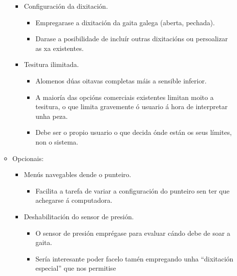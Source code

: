 \begin{itemize}
\begin{itemize}
\begin{itemize}
                 \item Configuración da dixitación.
                       \begin{itemize}
                        \item Empregarase a dixitación da gaita galega (aberta,
                              pechada).
                        \item Darase a posibilidade de incluír outras
                              dixitacións ou persoalizar as xa existentes.
                       \end{itemize}
                 \item Tesitura ilimitada.
                       \begin{itemize}
                        \item Alomenos dúas oitavas completas máis a sensible
                              inferior.
                        \item A maioría das opcións comerciais existentes
                              limitan moito a tesitura, o que limita gravemente
                              ó usuario á hora de interpretar unha peza.
                        \item Debe ser o propio usuario o que decida ónde están
                              os seus límites, non o sistema.
                       \end{itemize}
                \end{itemize}
          \item Opcionais:
                \begin{itemize}
                 \item Menús navegables dende o punteiro.
                       \begin{itemize}
                        \item Facilita a tarefa de variar a configuración do
                              punteiro sen ter que achegarse á computadora.
                       \end{itemize}
                 \item Deshabilitación do sensor de presión.
                       \begin{itemize}
                        \item O sensor de presión emprégase para evaluar cándo
                              debe de soar a gaita.
                        \item Sería interesante poder facelo tamén empregando
                              unha ``dixitación especial'' que nos permitise

\end{itemize}
\end{itemize}
\end{itemize}
\end{itemize}
